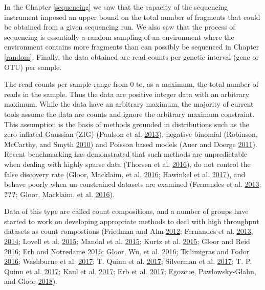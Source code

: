 \documentclass[onecolumn]{book}
\theoremstyle{definition}
\theoremstyle{definition}
\theoremstyle{definition}
\theoremstyle{remark}
\begin{document}
In the Chapter \ref{sequencing} we saw that the capacity of the
sequencing instrument imposed an upper bound on the total number of
fragments that could be obtained from a given sequencing run. We also
saw that the process of sequencing is essentially a random sampling of
an environment where the environment contains more fragments than can
possibly be sequenced in Chapter \ref{random}. Finally, the data
obtained are read counts per genetic interval (gene or OTU) per sample.

The read counts per sample range from 0 to, as a maximum, the total
number of reads in the sample. Thus the data are positive integer data
with an arbitrary maximum. While the data have an arbitrary maximum, the
majority of current tools assume the data are counts and ignore the
arbitrary maximum constraint. This assumption is the basis of methods
grounded in distributions such as the zero inflated Gaussian (ZIG)
(Paulson et al. \protect\hyperlink{ref-Paulson:2013aa}{2013}), negative
binomial (Robinson, McCarthy, and Smyth
\protect\hyperlink{ref-Robinson:2010}{2010}) and Poisson based models
(Auer and Doerge \protect\hyperlink{ref-auer:2011}{2011}). Recent
benchmarking has demonstrated that such methods are unpredictable when
dealing with highly sparse data (Thorsen et al.
\protect\hyperlink{ref-Thorsen:2016aa}{2016}), do not control the false
discovery rate (Gloor, Macklaim, et al.
\protect\hyperlink{ref-gloorAJS:2016}{2016}; Hawinkel et al.
\protect\hyperlink{ref-hawinkel2017}{2017}), and behave poorly when
un-constrained datasets are examined (Fernandes et al.
\protect\hyperlink{ref-fernandes:2013}{2013}; {\textbf{???}}; Gloor,
Macklaim, et al. \protect\hyperlink{ref-gloorAJS:2016}{2016}).

Data of this type are called count compositions, and a number of groups
have started to work on developing appropriate methods to deal with high
throughput datasets as count compostions (Friedman and Alm
\protect\hyperlink{ref-Friedman:2012}{2012}; Fernandes et al.
\protect\hyperlink{ref-fernandes:2013}{2013},
\protect\hyperlink{ref-fernandes:2014}{2014}; Lovell et al.
\protect\hyperlink{ref-Lovell:2015}{2015}; Mandal et al.
\protect\hyperlink{ref-ancom:2015}{2015}; Kurtz et al.
\protect\hyperlink{ref-Kurtz:2015}{2015}; Gloor and Reid
\protect\hyperlink{ref-Gloor:2016cjm}{2016}; Erb and Notredame
\protect\hyperlink{ref-erb:2016}{2016}; Gloor, Wu, et al.
\protect\hyperlink{ref-gloor2016s}{2016}; Tsilimigras and Fodor
\protect\hyperlink{ref-Tsilimigras:2016aa}{2016}; Washburne et al.
\protect\hyperlink{ref-Washburne:2017aa}{2017}; T. Quinn et al.
\protect\hyperlink{ref-Quinn:2017}{2017}; Silverman et al.
\protect\hyperlink{ref-Silverman:2017aa}{2017}; T. P. Quinn et al.
\protect\hyperlink{ref-Quinn206425}{2017}; Kaul et al.
\protect\hyperlink{ref-Kaul:2017aa}{2017}; Erb et al.
\protect\hyperlink{ref-Erb134536}{2017}; Egozcue, Pawlowsky-Glahn, and
Gloor \protect\hyperlink{ref-egozcue:AJS}{2018}).
\end{document}
